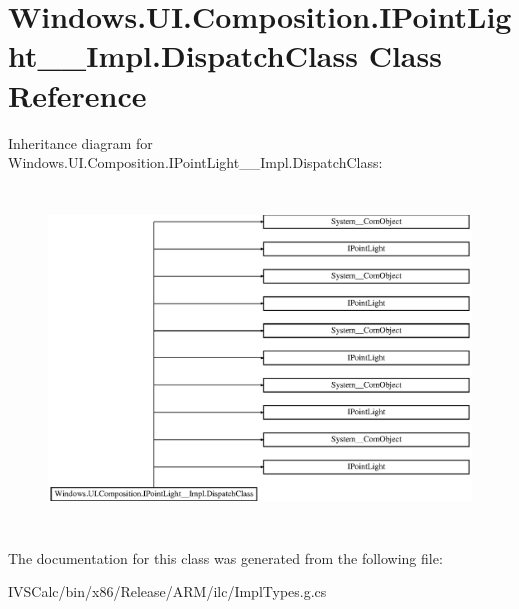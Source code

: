 \hypertarget{class_windows_1_1_u_i_1_1_composition_1_1_i_point_light_____impl_1_1_dispatch_class}{}\section{Windows.\+U\+I.\+Composition.\+I\+Point\+Light\+\_\+\+\_\+\+Impl.\+Dispatch\+Class Class Reference}
\label{class_windows_1_1_u_i_1_1_composition_1_1_i_point_light_____impl_1_1_dispatch_class}
Inheritance diagram for Windows.\+U\+I.\+Composition.\+I\+Point\+Light\+\_\+\+\_\+\+Impl.\+Dispatch\+Class\+:\begin{figure}[H]
\begin{center}
\leavevmode
\includegraphics[height=9.085546cm]{class_windows_1_1_u_i_1_1_composition_1_1_i_point_light_____impl_1_1_dispatch_class}
\end{center}
\end{figure}


The documentation for this class was generated from the following file\+:\begin{DoxyCompactItemize}
\item 
I\+V\+S\+Calc/bin/x86/\+Release/\+A\+R\+M/ilc/Impl\+Types.\+g.\+cs\end{DoxyCompactItemize}
